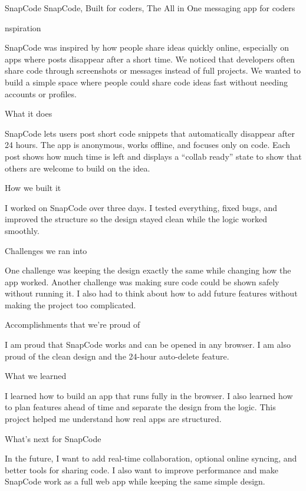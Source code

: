 SnapCode
SnapCode, Built for coders, The All in One messaging app for coders

nspiration

SnapCode was inspired by how people share ideas quickly online, especially on apps where posts disappear after a short time. We noticed that developers often share code through screenshots or messages instead of full projects. We wanted to build a simple space where people could share code ideas fast without needing accounts or profiles.

What it does

SnapCode lets users post short code snippets that automatically disappear after 24 hours. The app is anonymous, works offline, and focuses only on code. Each post shows how much time is left and displays a “collab ready” state to show that others are welcome to build on the idea.

How we built it

I worked on SnapCode over three days. I tested everything, fixed bugs, and improved the structure so the design stayed clean while the logic worked smoothly.

Challenges we ran into

One challenge was keeping the design exactly the same while changing how the app worked. Another challenge was making sure code could be shown safely without running it. I also had to think about how to add future features without making the project too complicated.

Accomplishments that we're proud of

I am proud that SnapCode works and can be opened in any browser. I am also proud of the clean design and the 24-hour auto-delete feature.

What we learned

I learned how to build an app that runs fully in the browser. I also learned how to plan features ahead of time and separate the design from the logic. This project helped me understand how real apps are structured.

What's next for SnapCode

In the future, I want to add real-time collaboration, optional online syncing, and better tools for sharing code. I also want to improve performance and make SnapCode work as a full web app while keeping the same simple design.
